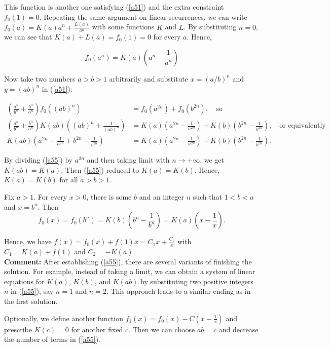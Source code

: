\documentclass[a4paper, 12pt]{article}
\begin{document}
\begin{enumerate}
This function is another one satisfying (\ref{a51}) and the extra constraint $f_0(1) = 0$. Repeating the same argument on linear recurrences, we can write $f_0(a) = K(a) a^n + \frac{L(a)}{a^n}$ with some functions $K$ and $L$. By substituting $n = 0$, we can see that $K(a) + L(a) = f_0(1) = 0$ for every $a$. Hence,

$$
f_0(a^n) = K(a) \left( a^n - \frac{1}{a^n}  \right)
$$

Now take two numbers $a > b > 1$ arbitrarily and substitute $x = (a/b)^n$ and $y = (ab)^n$ in (\ref{a51}):

\begin{align}
    \left(\frac{a^n}{b^n} + \frac{b^n}{a^n} \right) f_0((ab)^n) &= f_0(a^{2n}) + f_0(b^{2n}), \quad \textrm{so} \nonumber \\
    \left(\frac{a^n}{b^n} + \frac{b^n}{a^n} \right) K(ab) \left((ab)^n + \frac{1}{(ab)^n} \right) &= K(a) \left(a^{2n} - \frac{1}{a^{2n}} \right) + K(b) \left(b^{2n} - \frac{1}{b^{2n}} \right), \quad \textrm{or equivalently} \nonumber \\
    K(ab) \left( a^{2n} - \frac{1}{a^{2n}} + b^{2n} - \frac{1}{b^{2n}}    \right) &= K(a) \left(a^{2n} - \frac{1}{a^{2n}} \right) + K(b) \left(b^{2n} - \frac{1}{b^{2n}} \right) \label{a55}.
\end{align}

By dividing (\ref{a55}) by $a^{2n}$ and then taking limit with $n \to + \infty$, we get $K(ab) = K(a)$. Then (\ref{a55}) reduced to $K(a) = K(b)$. Hence, $K(a) = K(b)$ for all $a > b > 1$.

Fix $a > 1$. For every $x > 0$, there is some $b$ and an integer $n$ such that $1 < b < a$ and $x = b^n$. Then
$$
f_0(x) = f_0(b^n) = K(b) \left(b^n - \frac{1}{b^n} \right) = K(a) \left(  x  - \frac{1}{x} \right).
$$

Hence, we have $f(x) = f_0(x) + f(1)x = C_1 x + \frac{C_2}{x}$ with $C_1 = K(a) + f(1)$ and $C_2 = -K(a)$. \\

\textbf{Comment:}  After establishing (\ref{a55}), there are several variants of finishing the solution.  For example, instead of taking a limit, we can obtain a system of linear equations for $K(a)$, $K(b)$, and $K(ab)$ by substituting two positive integers $n$ in (\ref{a55}), say $n = 1$ and $n = 2$. This approach leads to a similar ending as in the first solution.

Optionally, we define another function $f_1(x) = f_0(x) - C(x - \frac{1}{x})$ and prescribe $K(c) = 0$ for another fixed $c$. Then we can choose $ab = c$ and decrease the number of terms in (\ref{a55}).

\vspace{6mm}


    

\end{enumerate}
\end{document}
